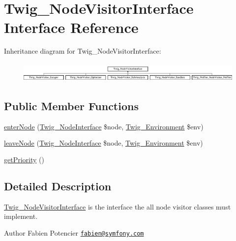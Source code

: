 \hypertarget{interface_twig___node_visitor_interface}{}\section{Twig\+\_\+\+Node\+Visitor\+Interface Interface Reference}
\label{interface_twig___node_visitor_interface}
Inheritance diagram for Twig\+\_\+\+Node\+Visitor\+Interface\+:\begin{figure}[H]
\begin{center}
\leavevmode
\includegraphics[height=1.032258cm]{interface_twig___node_visitor_interface}
\end{center}
\end{figure}
\subsection*{Public Member Functions}
\begin{DoxyCompactItemize}
\item 
\hyperlink{interface_twig___node_visitor_interface_ad3bfee38f2bc56df9500da7f20b6e13a}{enter\+Node} (\hyperlink{interface_twig___node_interface}{Twig\+\_\+\+Node\+Interface} \$node, \hyperlink{class_twig___environment}{Twig\+\_\+\+Environment} \$env)
\item 
\hyperlink{interface_twig___node_visitor_interface_a436bb1ae16511148e860e5cfa2cad88f}{leave\+Node} (\hyperlink{interface_twig___node_interface}{Twig\+\_\+\+Node\+Interface} \$node, \hyperlink{class_twig___environment}{Twig\+\_\+\+Environment} \$env)
\item 
\hyperlink{interface_twig___node_visitor_interface_a1e7a3c168dcd0901a0d2669c67575b55}{get\+Priority} ()
\end{DoxyCompactItemize}


\subsection{Detailed Description}
\hyperlink{interface_twig___node_visitor_interface}{Twig\+\_\+\+Node\+Visitor\+Interface} is the interface the all node visitor classes must implement.

\begin{DoxyAuthor}{Author}
Fabien Potencier \href{mailto:fabien@symfony.com}{\tt fabien@symfony.\+com} 
\end{DoxyAuthor}


